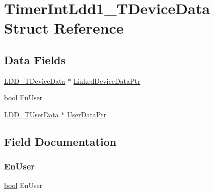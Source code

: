 \hypertarget{struct_timer_int_ldd1___t_device_data}{}\section{Timer\+Int\+Ldd1\+\_\+\+T\+Device\+Data Struct Reference}
\label{struct_timer_int_ldd1___t_device_data}
\subsection*{Data Fields}
\begin{DoxyCompactItemize}
\item 
\hyperlink{group___p_e___types__module_gac5cf1362f1f0e3a2ce71b1bf2276d091}{L\+D\+D\+\_\+\+T\+Device\+Data} $\ast$ \hyperlink{struct_timer_int_ldd1___t_device_data_ab60a09fb32366f080571d3d2a9b1f8ff}{Linked\+Device\+Data\+Ptr}
\item 
\hyperlink{group___p_e___types__module_ga97a80ca1602ebf2303258971a2c938e2}{bool} \hyperlink{struct_timer_int_ldd1___t_device_data_a7ba0faa255cde123b5d81face49f8fa2}{En\+User}
\item 
\hyperlink{group___p_e___types__module_ga0b66a73f87238a782318aa0be7578e35}{L\+D\+D\+\_\+\+T\+User\+Data} $\ast$ \hyperlink{struct_timer_int_ldd1___t_device_data_a8e77b9d030b00c231823350a904e0f83}{User\+Data\+Ptr}
\end{DoxyCompactItemize}


\subsection{Field Documentation}
\mbox{\label{struct_timer_int_ldd1___t_device_data_a7ba0faa255cde123b5d81face49f8fa2}} 
\subsubsection{\texorpdfstring{En\+User}{EnUser}}
{\footnotesize\ttfamily \hyperlink{group___p_e___types__module_ga97a80ca1602ebf2303258971a2c938e2}{bool} En\+User}

\mbox{\label{struct_timer_int_ldd1___t_device_data_ab60a09fb32366f080571d3d2a9b1f8ff}} 
